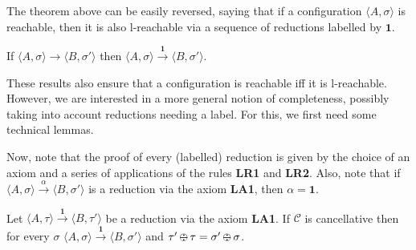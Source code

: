 \documentclass{llncs}
\def\1{{\mathbf 1}}
\def\C{{\mathcal C}}
\newcommand{\comment}[1]{}
\def\monid{{\mathbf 0}}
\def\1{{\mathbf 1}}
\def\C{{\mathcal C}}
\def\odiv{\, {\ominus\hspace{-7.7pt} \div} \,}
\def\monid{\mathbf{1}}
\begin{document}
The theorem above can be easily reversed, saying that if a configuration $\langle A, \sigma \rangle$ is reachable,
then it is also l-reachable via a sequence of reductions labelled by $\monid$.

\begin{lemma}
\label{idred}
If %
$\langle A, \sigma \rangle \to \langle B, \sigma' \rangle$
then %
$\langle A, \sigma \rangle \xrightarrow{\monid}  \langle B, \sigma' \rangle$.
\end{lemma}


	
These results also ensure that a configuration is reachable iff it is l-reachable.
%
However, we are interested in a more general notion of completeness, possibly taking into account 
reductions needing a label. For this, we first need some technical lemmas.
%
\comment{
\begin{lemma}
\label{minor}
Let $\langle A, \tau \rangle$ be a reachable configuration such that
$\sigma \leq \tau$. If $\C$ is invertible then $\langle A, \sigma \rangle$ is a reachable configuration.
%
Moreover, if  $\langle A, \tau \rangle \to \langle B, \tau' \rangle$ then
$\langle A, \sigma \rangle \to \langle B', \sigma' \rangle$ 
with $\sigma' = \tau' \otimes (\sigma \odiv \tau)$.
Furthermore, if $\C$ is also cancellative then $B = B'$.
\end{lemma}
}
%

Now, note that the proof of every (labelled) reduction is given by the choice of an axiom 
and a series of applications of the rules {\bf LR1} and  {\bf LR2}.
Also, note that if 
$\langle A, \sigma \rangle \xrightarrow{\alpha} \langle B, \sigma' \rangle$ is a reduction 
via the axiom {\bf LA1}, then $\alpha = \1$.

\begin{lemma}
\label{LA1}
Let $\langle A, \tau \rangle \xrightarrow{\monid} \langle B, \tau' \rangle$ be a reduction 
via the axiom {\bf LA1}. 
If $\C$ is cancellative then 
for every $\sigma$
$\langle A, \sigma \rangle \xrightarrow{\monid} \langle B, \sigma' \rangle$
and $\tau' \odiv \tau = \sigma' \odiv \sigma$.
\end{lemma}


\comment{
\begin{lemma}
\label{riminor}
Let $\langle A, \tau \rangle \xrightarrow{\beta} \langle B, \tau' \rangle$ with $\alpha \leq \beta$. 
%
If $\beta \neq \monid$ then $\langle A, \tau \rangle \xrightarrow{\alpha} \langle B, \tau' \otimes (\alpha \odiv \beta) \rangle$.
\end{lemma}

\todo{questo lemma ora serve?}
The lemma just states that the label in a reduction can always be strengthened,
as long as rule  {\bf LA1} is not used in the reduction labelled by $\beta$.
The proof exploits the premise of rule {\bf LA2} together with Lemma~\ref{l-mono},
and the condition $\beta \neq \monid$ is required in the inductive step for rule  {\bf LR2}.
}
\end{document}
